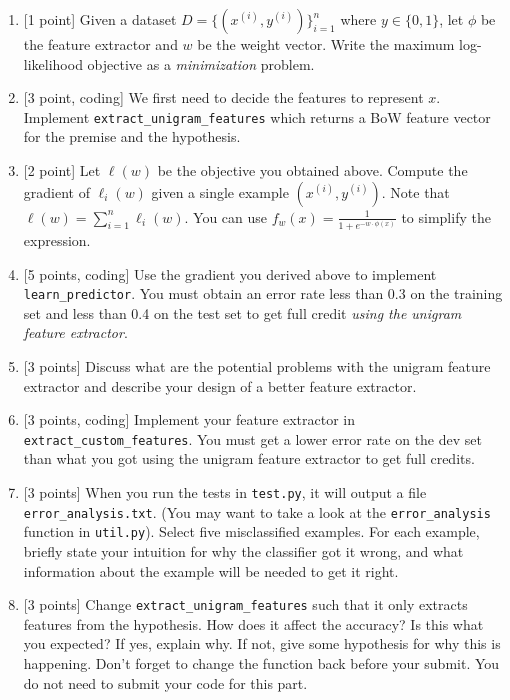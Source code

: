 \documentclass{article}
\theoremstyle{case}
\theoremstyle{definition}
\begin{document}
\begin{enumerate}
    \item {[1 point]} Given a dataset $D=\{(x^{(i)}, y^{(i)})\}_{i=1}^n$ where $y\in\{0,1\}$, let $\phi$ be the feature extractor and $w$ be the weight vector. Write the maximum log-likelihood objective as a \textit{minimization} problem.

    \newpage
    \item {[3 point, coding]} We first need to decide the features to represent $x$.
        Implement \texttt{extract\_unigram\_features} which returns a BoW feature vector for the premise and the hypothesis.


    \newpage
    \item {[2 point]} Let $\ell(w)$ be the objective you obtained above.
    Compute the gradient of $\ell_i(w)$ given a single example $(x^{(i)}, y^{(i)})$.
        Note that $\ell(w) = \sum_{i=1}^n \ell_i(w)$.
        You can use $f_w(x) = \frac{1}{1 + e^{-w\cdot\phi(x)}}$
        to simplify the expression.

    \newpage
    \item {[5 points, coding]} Use the gradient you derived above to implement \texttt{learn\_predictor}.
        You must obtain an error rate less than 0.3 on the training set and less than 0.4 on the test set to get full credit \emph{using the unigram feature extractor}.


    \newpage
    \item {[3 points]} Discuss what are the potential problems with the unigram feature extractor
        and describe your design of a better feature extractor. 


    \newpage
    \item {[3 points, coding]}
        Implement your feature extractor in \texttt{extract\_custom\_features}.
        You must get a lower error rate on the dev set than what you got using the unigram feature extractor to get full credits.


    \newpage
\item {[3 points]} When you run the tests in \texttt{test.py}, it will output a file \texttt{error\_analysis.txt}. (You may want to take a look at the \texttt{error\_analysis} function in \texttt{util.py}).
    Select five misclassified examples.
        For each example, briefly state your intuition for why the classifier got it wrong, and what information about the example will be needed to get it right.


    \newpage
\item {[3 points]} Change \texttt{extract\_unigram\_features} such that it only extracts features from the hypothesis.
    How does it affect the accuracy? Is this what you expected? If yes, explain why. If not, give some hypothesis for why this is happening.
    Don't forget to change the function back before your submit. You do not need to submit your code for this part.

\end{enumerate}
\end{document}
